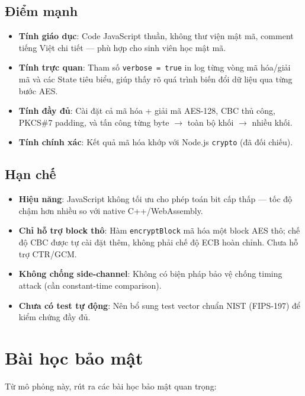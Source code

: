 \subsection{Điểm mạnh}

\begin{itemize}
    \item \textbf{Tính giáo dục}: Code JavaScript thuần, không thư viện mật mã, comment tiếng Việt chi tiết --- phù hợp cho sinh viên học mật mã.
    \item \textbf{Tính trực quan}: Tham số \texttt{verbose = true} in log từng vòng mã hóa/giải mã và các State tiêu biểu, giúp thấy rõ quá trình biến đổi dữ liệu qua từng bước AES.
    \item \textbf{Tính đầy đủ}: Cài đặt cả mã hóa + giải mã AES-128, CBC thủ công, PKCS\#7 padding, và tấn công từng byte $\rightarrow$ toàn bộ khối $\rightarrow$ nhiều khối.
    \item \textbf{Tính chính xác}: Kết quả mã hóa khớp với Node.js \texttt{crypto} (đã đối chiếu).
\end{itemize}

\subsection{Hạn chế}

\begin{itemize}
    \item \textbf{Hiệu năng}: JavaScript không tối ưu cho phép toán bit cấp thấp --- tốc độ chậm hơn nhiều so với native C++/WebAssembly.
    \item \textbf{Chỉ hỗ trợ block thô}: Hàm \texttt{encryptBlock} mã hóa một block AES thô; chế độ CBC được tự cài đặt thêm, không phải chế độ ECB hoàn chỉnh. Chưa hỗ trợ CTR/GCM.
    \item \textbf{Không chống side-channel}: Không có biện pháp bảo vệ chống timing attack (cần constant-time comparison).
    \item \textbf{Chưa có test tự động}: Nên bổ sung test vector chuẩn NIST (FIPS-197) để kiểm chứng đầy đủ.
\end{itemize}

\section{Bài học bảo mật}
\label{sec:lessons}

Từ mô phỏng này, rút ra các bài học bảo mật quan trọng:

